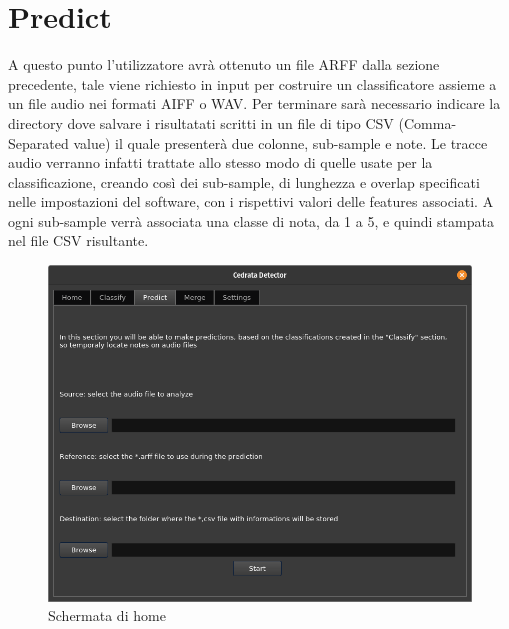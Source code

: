\section{Predict}
A questo punto l'utilizzatore avrà ottenuto un file ARFF dalla sezione precedente, tale viene richiesto in input per costruire un classificatore assieme a un file audio nei formati AIFF o WAV. Per terminare sarà necessario indicare la directory dove salvare i risultatati scritti in un file di tipo CSV (Comma-Separated value) il quale presenterà due colonne, sub-sample e note. Le tracce audio verranno infatti trattate allo stesso modo di quelle usate per la classificazione, creando così dei sub-sample, di lunghezza e overlap specificati nelle impostazioni del software, con i rispettivi valori delle features associati. A ogni sub-sample verrà associata una classe di nota, da 1 a 5, e quindi stampata nel file CSV risultante.
\begin{figure}[h!]
	\begin{center}
		\includegraphics[scale=0.5]{./immagini/gui/predict.png}
	\end{center}
	\caption{Schermata di home}\label{fig:gui-predict}
\end{figure}

